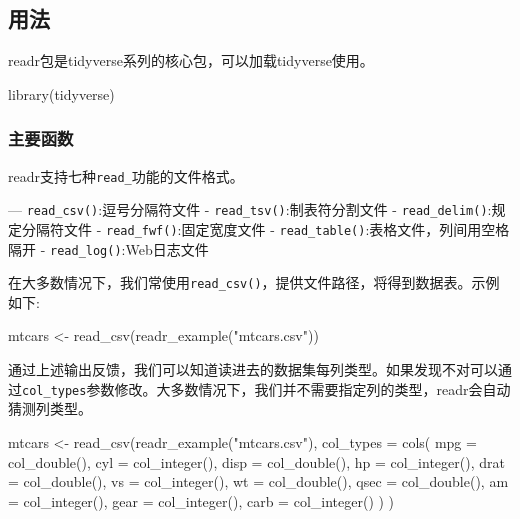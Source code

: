 \documentclass[
]{book}
\newenvironment{Shaded}{\begin{snugshade}}{\end{snugshade}}
\newcommand{\AttributeTok}[1]{\textcolor[rgb]{0.77,0.63,0.00}{#1}}
\newcommand{\FunctionTok}[1]{\textcolor[rgb]{0.00,0.00,0.00}{#1}}
\newcommand{\NormalTok}[1]{#1}
\newcommand{\OtherTok}[1]{\textcolor[rgb]{0.56,0.35,0.01}{#1}}
\newcommand{\StringTok}[1]{\textcolor[rgb]{0.31,0.60,0.02}{#1}}
\begin{document}
\hypertarget{ux7528ux6cd5-2}{%
\subsection{用法}\label{ux7528ux6cd5-2}}

readr包是tidyverse系列的核心包，可以加载tidyverse使用。

\begin{Shaded}
\begin{Highlighting}[]
\FunctionTok{library}\NormalTok{(tidyverse)}
\end{Highlighting}
\end{Shaded}

\hypertarget{ux4e3bux8981ux51fdux6570}{%
\subsubsection{主要函数}\label{ux4e3bux8981ux51fdux6570}}

readr支持七种\texttt{read\_}功能的文件格式。

--- \texttt{read\_csv()}:逗号分隔符文件
- \texttt{read\_tsv()}:制表符分割文件
- \texttt{read\_delim()}:规定分隔符文件
- \texttt{read\_fwf()}:固定宽度文件
- \texttt{read\_table()}:表格文件，列间用空格隔开
- \texttt{read\_log()}:Web日志文件

在大多数情况下，我们常使用\texttt{read\_csv()}，提供文件路径，将得到数据表。示例如下:

\begin{Shaded}
\begin{Highlighting}[]
\NormalTok{mtcars }\OtherTok{\textless{}{-}} \FunctionTok{read\_csv}\NormalTok{(}\FunctionTok{readr\_example}\NormalTok{(}\StringTok{"mtcars.csv"}\NormalTok{))}
\end{Highlighting}
\end{Shaded}

通过上述输出反馈，我们可以知道读进去的数据集每列类型。如果发现不对可以通过\texttt{col\_types}参数修改。大多数情况下，我们并不需要指定列的类型，readr会自动猜测列类型。

\begin{Shaded}
\begin{Highlighting}[]
\NormalTok{mtcars }\OtherTok{\textless{}{-}} \FunctionTok{read\_csv}\NormalTok{(}\FunctionTok{readr\_example}\NormalTok{(}\StringTok{"mtcars.csv"}\NormalTok{), }\AttributeTok{col\_types =} 
  \FunctionTok{cols}\NormalTok{(}
    \AttributeTok{mpg =} \FunctionTok{col\_double}\NormalTok{(),}
    \AttributeTok{cyl =} \FunctionTok{col\_integer}\NormalTok{(),}
    \AttributeTok{disp =} \FunctionTok{col\_double}\NormalTok{(),}
    \AttributeTok{hp =} \FunctionTok{col\_integer}\NormalTok{(),}
    \AttributeTok{drat =} \FunctionTok{col\_double}\NormalTok{(),}
    \AttributeTok{vs =} \FunctionTok{col\_integer}\NormalTok{(),}
    \AttributeTok{wt =} \FunctionTok{col\_double}\NormalTok{(),}
    \AttributeTok{qsec =} \FunctionTok{col\_double}\NormalTok{(),}
    \AttributeTok{am =} \FunctionTok{col\_integer}\NormalTok{(),}
    \AttributeTok{gear =} \FunctionTok{col\_integer}\NormalTok{(),}
    \AttributeTok{carb =} \FunctionTok{col\_integer}\NormalTok{()}
\NormalTok{  )}
\NormalTok{)}
\end{Highlighting}
\end{Shaded}
\end{document}
